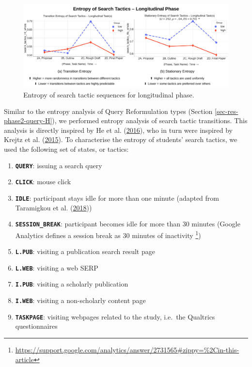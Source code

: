 \documentclass[letterpaper, nobind]{templates/ociamthesis}
\providecommand{\tightlist}{%
  \setlength{\itemsep}{0pt}\setlength{\parskip}{0pt}}
\begin{document}
\begin{figure}

{\centering \includegraphics[width=1\linewidth]{figs/rp2-tactic-entropy} 

}

\caption[Entropy of search tactic sequences for longitudinal phase.]{Entropy of search tactic sequences for longitudinal phase.}\label{fig:rp2-tactic-entropy}
\end{figure}





Similar to the entropy analysis of Query Reformulation types (Section \ref{sec-res-phase2-query-H}), we performed entropy analysis of search tactic transitions.
This analysis is directly inspired by He et al. (\protect\hyperlink{ref-he2016beyond}{2016}), who in turn were inspired by Krejtz et al. (\protect\hyperlink{ref-krejtz2015gaze}{2015}).
To characterise the entropy of students' search tactics, we used the following set of states, or tactics:

\begin{enumerate}
\def\labelenumi{\arabic{enumi}.}
\tightlist
\item
  \textbf{\texttt{QUERY}}: issuing a search query
\item
  \textbf{\texttt{CLICK}}: mouse click
\item
  \textbf{\texttt{IDLE}}: participant stays idle for more than one minute (adapted from Taramigkou et al. (\protect\hyperlink{ref-taramigkou2018leveraging}{2018}))
\item
  \textbf{\texttt{SESSION\_BREAK}}: participant becomes idle for more than 30 minutes (Google Analytics defines a session break as 30 minutes of inactivity \footnote{\url{https://support.google.com/analytics/answer/2731565\#zippy=\%2Cin-this-article}})
\item
  \textbf{\texttt{L.PUB}}: visiting a publication search result page
\item
  \textbf{\texttt{L.WEB}}: visiting a web SERP
\item
  \textbf{\texttt{I.PUB}}: visiting a scholarly publication
\item
  \textbf{\texttt{I.WEB}}: visiting a non-scholarly content page
\item
  \textbf{\texttt{TASKPAGE}}: visiting webpages related to the study, i.e.~the Qualtrics questionnaires
\end{enumerate}
\end{document}
